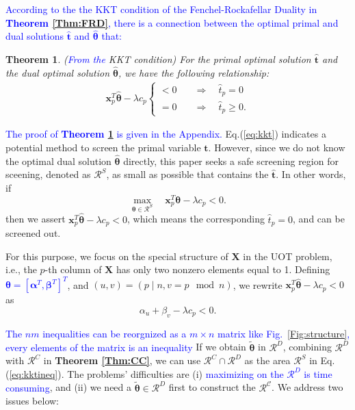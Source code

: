 \documentclass[twoside]{article}
\theoremstyle{plain}
\newtheorem{thm}{Theorem}
\newcommand{\mat}[1]{\mathbf{#1}}
\renewcommand{\vec}[1]{\bm{#1}}
\newcommand{\changeXS}[1]{\textcolor{blue}{#1}}
\begin{document}
\changeXS{According to the the KKT condition of the Fenchel-Rockafellar Duality in {\bf Theorem \ref{Thm:FRD}}, there is a connection between the optimal primal and dual solutions $ \hat{\vec{t}}$ and $\hat{\vec{\theta}}$ that:}
\begin{thm}(\changeXS{From the }KKT condition) For the primal optimal solution $\hat{\vec{t}}$ and the dual optimal solution $\hat{\vec{\theta}}$, we have the following relationship:
\label{Thm:KKT}
 \begin{equation}
\begin{split}
\vec{x}_p^T\hat{\vec{\theta}} -\lambda c_p \left\{
\begin{aligned}
< 0 \quad& \Longrightarrow \quad\hat{t}_p = 0\\
= 0 \quad& \Longrightarrow \quad\hat{t}_p \geq 0.
\end{aligned}
\right.
 \end{split}
 \label{eq:kkt}
\end{equation}
\end{thm}
\changeXS{The proof of {\bf Theorem \ref{Thm:KKT}} is given in the Appendix.} Eq.(\ref{eq:kkt}) indicates a potential method to screen the primal variable $\vec{t}$. However, since we do not know the optimal dual solution $\hat{\vec{\theta}}$ directly, this paper seeks a safe screening region for sceening, denoted as $\mathcal{R}^{S}$, as small as possible that contains the $\hat{\vec{t}}$. In other words, if
\begin{equation}
\label{eq:kktineq}
\max_{\vec{\theta} \in \mathcal{R}^S}\quad  \vec{x}_p^T\vec{\theta} -\lambda c_p < 0.
\end{equation}
then we assert 
$\vec{x}_p^T\hat{\vec{\theta}} -\lambda c_p < 0$,
which means the corresponding $\hat{{t}}_p = 0$, and can be screened out. 

For this purpose, we focus on the special structure of $\mat{X}$ in the UOT problem, i.e., the $p$-th column of $\mat{X}$ has only two nonzero elements equal to 1. Defining  \changeXS{$\vec{\theta} = [{\vec{\alpha}}^T,{\vec{\beta}}^T]^T$}, and $(u,v)=(p \mid n,v= p \mod n)$, we rewrite $\vec{x}_p^T\hat{\vec{\theta}} -\lambda c_p < 0$ as
%
\begin{equation}
\alpha_{u} + \beta_{v}-\lambda c_p < 0.
\end{equation}

\changeXS{The $nm$ inequalities can be reorgnized as a  $m \times n$ matrix like Fig.~\ref{Fig:structure}, every elements of the matrix is an inequality} If we obtain $\tilde{\vec{\theta}}$ in $\mathcal{R}^{D}$, combining $\mathcal{R}^{D}$ with $\mathcal{R}^{C}$ in {\bf Theorem \ref{Thm:CC}}, we can use $\mathcal{R}^{C}\cap\mathcal{R}^{D}$ as the area $\mathcal{R}^{S}$ in Eq.(\ref{eq:kktineq}). The problems' difficulties are (i) \changeXS{maximizing on the $\mathcal{R}^{D}$ is time consuming}, and (ii) we need a $\tilde{\vec{\theta}} \in \mathcal{R}^{D}$ first to construct the $\mathcal{R^{C}}$. We address two issues below:
\end{document}
